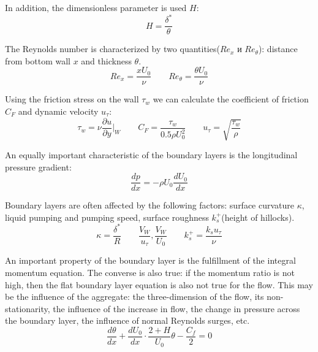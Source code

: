 	In addition, the dimensionless parameter is used $H$:
	\begin{equation}
		H = \frac{\delta^*}{\theta}
	\end{equation}

	The Reynolds number is characterized by two quantities($Re_x$ и $Re_\theta$): distance from bottom wall $x$ and thickness $\theta$.
	\begin{equation}
		Re_x = \frac{xU_0}{\nu} \qquad Re_\theta = \frac{\theta U_0}{\nu}
	\end{equation}

	Using the friction stress on the wall $\tau_w$ we can calculate the coefficient of friction $C_F$ and dynamic velocity $u_\tau$:
	\begin{equation}
		\tau_w = \nu\frac{\partial u}{\partial y}\bigg|_W \qquad C_F = \frac{\tau_w}{0.5\rho U_0^2} \qquad u_\tau = \sqrt{\frac{\tau_w}{\rho}}
	\end{equation}
	
	An equally important characteristic of the boundary layers is the longitudinal pressure gradient:
	\begin{equation}
		\frac{dp}{dx} = -\rho U_0 \frac{dU_0}{dx}
	\end{equation}
	
	Boundary layers are often affected by the following factors: surface curvature $\kappa$, liquid pumping and pumping speed, surface roughness $k_s^+$(height of hillocks).
	\begin{equation}
		\kappa = \frac{\delta^*}{R} \qquad \frac{V_W}{u_\tau}, \frac{V_W}{U_0} \qquad k_s^+ = \frac{k_s u_\tau}{\nu}
	\end{equation}

	An important property of the boundary layer is the fulfillment of the integral momentum equation. The converse is also true: if the momentum ratio is not high, then the flat boundary layer equation is also not true for the flow. This may be the influence of the aggregate: the three-dimension of the flow, its non-stationarity, the influence of the increase in flow, the change in pressure across the boundary layer, the influence of normal Reynolds surges, etc.
	\begin{equation}
		\frac{d\theta}{dx} + \frac{dU_0}{dx}\cdot\frac{2 + H}{U_0}\theta - \frac{C_f}{2} = 0
	\end{equation}
	
